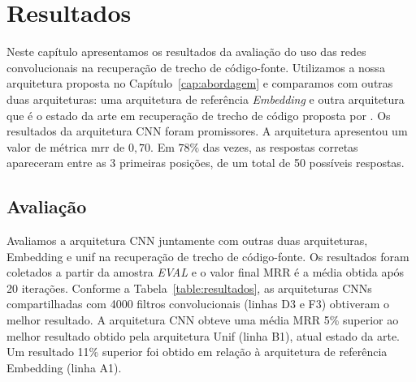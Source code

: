 \chapter{Resultados}
\label{cap:resultados}

Neste capítulo apresentamos os resultados da avaliação do uso das redes convolucionais na recuperação de trecho de código-fonte. Utilizamos a nossa arquitetura proposta no Capítulo~\ref{cap:abordagem} e comparamos com outras duas arquiteturas: uma arquitetura de referência \textit{Embedding} e outra arquitetura que é o estado da arte em recuperação de trecho de código proposta por \cite{cambronero-deep-learning-code-search:2019}. Os resultados da arquitetura CNN foram promissores. A arquitetura apresentou um valor de métrica \acrfull{mrr} de $0,70$. Em $78\%$ das vezes, as respostas corretas apareceram entre as 3 primeiras posições, de um total de 50 possíveis respostas.

\section{Avaliação}
\label{sec:resultados-avaliacao}

Avaliamos a arquitetura CNN juntamente com outras duas arquiteturas, Embedding e \Gls{unif} na recuperação de trecho de código-fonte. Os resultados foram coletados a partir da amostra \emph{EVAL} e o valor final MRR é a média obtida após 20 iterações. Conforme a Tabela~\ref{table:resultados}, as arquiteturas CNNs compartilhadas com 4000 filtros convolucionais (linhas D3 e F3) obtiveram o melhor resultado. A arquitetura CNN obteve uma média MRR 5\% superior ao melhor resultado obtido pela arquitetura Unif (linha B1), atual estado da arte. Um resultado 11\% superior foi obtido em relação à arquitetura de referência Embedding (linha A1). 

